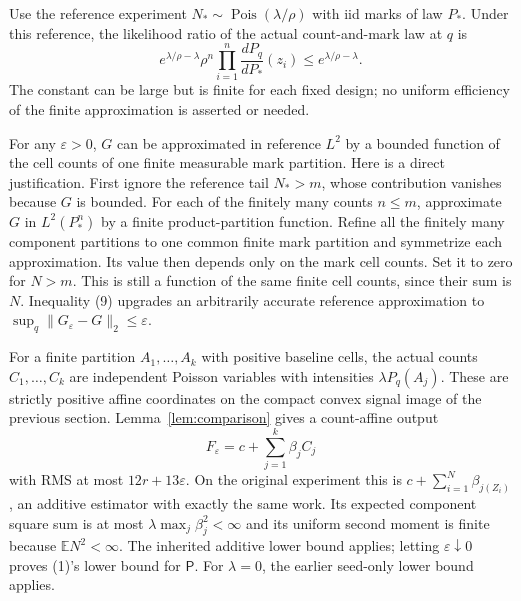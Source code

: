 \documentclass[11pt]{article}
\newcommand{\E}{\mathbb E}
\begin{document}
Use the reference experiment $N_*\sim\operatorname{Pois}(\lambda/\rho)$
with iid marks of law $P_*$. Under this reference, the likelihood ratio of
the actual count-and-mark law at $q$ is
\[
 e^{\lambda/\rho-\lambda}\rho^n
       \prod_{i=1}^n\frac{dP_q}{dP_*}(z_i)
       \le e^{\lambda/\rho-\lambda}.                       \tag{9}
\]
The constant can be large but is finite for each fixed design; no uniform
efficiency of the finite approximation is asserted or needed.

For any $\varepsilon>0$, $G$ can be approximated in reference $L^2$ by a
bounded function of the cell counts of one finite measurable mark
partition. Here is a direct justification. First ignore the reference tail
$N_*>m$, whose contribution vanishes because $G$ is bounded. For each of
the finitely many counts $n\le m$, approximate $G$ in $L^2(P_*^n)$ by a
finite product-partition function. Refine all the finitely many component
partitions to one common finite mark partition and symmetrize each
approximation. Its value then depends only on the mark cell counts.
Set it to zero for $N>m$. This is still a function of the same finite cell
counts, since their sum is $N$. Inequality (9) upgrades an arbitrarily
accurate reference approximation to
$\sup_q\|G_\varepsilon-G\|_2\le\varepsilon$.

For a finite partition $A_1,\ldots,A_k$ with positive baseline cells, the
actual counts $C_1,\ldots,C_k$ are independent Poisson variables with
intensities $\lambda P_q(A_j)$. These are strictly positive affine
coordinates on the compact convex signal image of the previous section.
Lemma~\ref{lem:comparison} gives a count-affine output
\[
                  F_\varepsilon=c+\sum_{j=1}^k\beta_j C_j
\]
with RMS at most $12r+13\varepsilon$. On the original experiment this is
$c+\sum_{i=1}^N\beta_{j(Z_i)}$, an additive estimator with exactly the same
work. Its expected component square sum is at most
$\lambda\max_j\beta_j^2<\infty$ and its uniform second moment is finite
because $\E N^2<\infty$. The inherited additive lower bound applies;
letting $\varepsilon\downarrow0$ proves (1)'s lower bound for $\mathsf P$.
For $\lambda=0$, the earlier seed-only lower bound applies.
\end{document}
